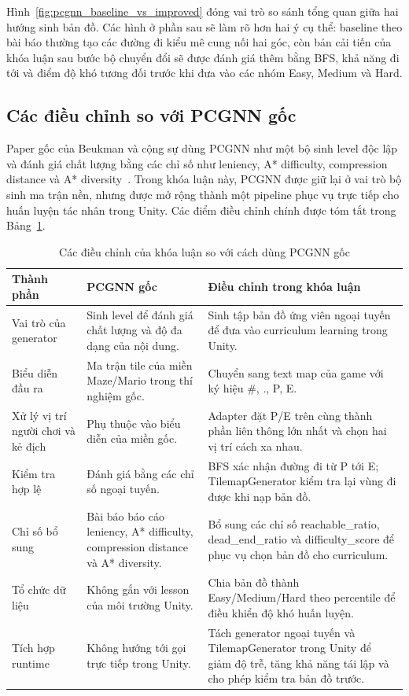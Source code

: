 Hình~\ref{fig:pcgnn_baseline_vs_improved} đóng vai trò so sánh tổng quan giữa hai hướng sinh bản đồ. Các hình ở phần sau sẽ làm rõ hơn hai ý cụ thể: baseline theo bài báo thường tạo các đường đi kiểu mê cung nối hai góc, còn bản cải tiến của khóa luận sau bước bộ chuyển đổi sẽ được đánh giá thêm bằng BFS, khả năng đi tới và điểm độ khó tương đối trước khi đưa vào các nhóm Easy, Medium và Hard.

\subsection{Các điều chỉnh so với PCGNN gốc}

Paper gốc của Beukman và cộng sự dùng PCGNN như một bộ sinh level độc lập và đánh giá chất lượng bằng các chỉ số như leniency, A* difficulty, compression distance và A* diversity~\cite{Beukman2022}. Trong khóa luận này, PCGNN được giữ lại ở vai trò bộ sinh ma trận nền, nhưng được mở rộng thành một pipeline phục vụ trực tiếp cho huấn luyện tác nhân trong Unity. Các điểm điều chỉnh chính được tóm tắt trong Bảng~\ref{tab:pcgnn_improvements}.

\begin{table}[H]
    \centering
    \small
    \caption{Các điều chỉnh của khóa luận so với cách dùng PCGNN gốc}
    \label{tab:pcgnn_improvements}
    \begin{tabular}{p{4.0cm} p{5.0cm} p{5.0cm}}
        \toprule
        \textbf{Thành phần} & \textbf{PCGNN gốc} & \textbf{Điều chỉnh trong khóa luận} \\
        \midrule
        Vai trò của generator & Sinh level để đánh giá chất lượng và độ đa dạng của nội dung. & Sinh tập bản đồ ứng viên ngoại tuyến để đưa vào curriculum learning trong Unity. \\
        Biểu diễn đầu ra & Ma trận tile của miền Maze/Mario trong thí nghiệm gốc. & Chuyển sang text map của game với ký hiệu \#, ., P, E. \\
        Xử lý vị trí người chơi và kẻ địch & Phụ thuộc vào biểu diễn của miền gốc. & Adapter đặt P/E trên cùng thành phần liên thông lớn nhất và chọn hai vị trí cách xa nhau. \\
        Kiểm tra hợp lệ & Đánh giá bằng các chỉ số ngoại tuyến. & BFS xác nhận đường đi từ P tới E; TilemapGenerator kiểm tra lại vùng đi được khi nạp bản đồ. \\
        Chỉ số bổ sung & Bài báo báo cáo leniency, A* difficulty, compression distance và A* diversity. & Bổ sung các chỉ số reachable\_ratio, dead\_end\_ratio và difficulty\_score để phục vụ chọn bản đồ cho curriculum. \\
        Tổ chức dữ liệu & Không gắn với lesson của môi trường Unity. & Chia bản đồ thành Easy/Medium/Hard theo percentile để điều khiển độ khó huấn luyện. \\
        Tích hợp runtime & Không hướng tới gọi trực tiếp trong Unity. & Tách generator ngoại tuyến và TilemapGenerator trong Unity để giảm độ trễ, tăng khả năng tái lập và cho phép kiểm tra bản đồ trước. \\
        \bottomrule
    \end{tabular}
\end{table}

